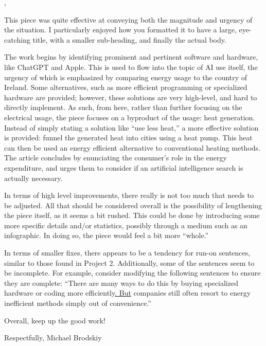 \documentclass[letterpaper,11pt]{texMemo} %
\begin{document}
\maketitle %


,

This piece was quite effective at conveying both the magnitude and urgency of the situation. I particularly enjoyed how you formatted it to have a large, eye-catching title, with a smaller sub-heading, and finally the actual body.

The work begins by identifying prominent and pertinent software and hardware, like ChatGPT and Apple. This is used to flow into the topic of AI use itself, the urgency of which is emphasized by comparing energy usage to the country of Ireland. Some alternatives, such as more efficient programming or specialized hardware are provided; however, these solutions are very high-level, and hard to directly implement. As such, from here, rather than further focusing on the electrical usage, the piece focuses on a byproduct of the usage: heat generation. Instead of simply stating a solution like ``use less heat,'' a more effective solution is provided: funnel the generated heat into cities using a heat pump. This heat can then be used an energy efficient alternative to conventional heating methods. The article concludes by enunciating the consumer's role in the energy expenditure, and urges them to consider if an artificial intelligence search is actually necessary.

In terms of high level improvements, there really is not too much that needs to be adjusted. All that should be considered overall is the possibility of lengthening the piece itself, as it seems a bit rushed. This could be done by introducing some more specific details and/or statistics, possibly through a medium such as an infographic. In doing so, the piece would feel a bit more ``whole.''

In terms of smaller fixes, there appears to be a tendency for run-on sentences, similar to those found in Project 2. Additionally, some of the sentences seem to be incomplete. For example, consider modifying the following sentences to ensure they are complete: ``There are many ways to do this by buying specialized hardware or coding more efficiently\underline{. But} companies still often resort to energy inefficient methods simply out of convenience.''

Overall, keep up the good work!

Respectfully,
Michael Brodskiy


\end{document}
